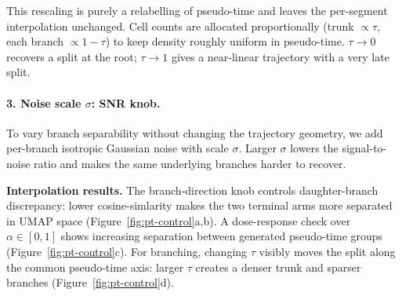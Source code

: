 \documentclass[10pt]{article}
\begin{document}
This rescaling is purely a relabelling of pseudo-time and leaves the per-segment interpolation unchanged. Cell counts are allocated proportionally (trunk \(\propto \tau\), each branch \(\propto 1 - \tau\)) to keep density roughly uniform in pseudo-time. \(\tau \to 0\) recovers a split at the root; \(\tau \to 1\) gives a near-linear trajectory with a very late split.

\paragraph{3. Noise scale \(\sigma\): SNR knob.} To vary branch separability without changing the trajectory geometry, we add per-branch isotropic Gaussian noise with scale \(\sigma\). Larger \(\sigma\) lowers the signal-to-noise ratio and makes the same underlying branches harder to recover.

\textbf{Interpolation results.} The branch-direction knob controls daughter-branch discrepancy: lower cosine-simlarity makes the two terminal arms more separated in UMAP space (Figure~\ref{fig:pt-control}a,b). A dose-response check over \(\alpha\in[0,1]\) shows increasing separation between generated pseudo-time groups (Figure~\ref{fig:pt-control}c). For branching, changing \(\tau\) visibly moves the split along the common pseudo-time axis: larger \(\tau\) creates a denser trunk and sparser branches (Figure~\ref{fig:pt-control}d).
\end{document}
